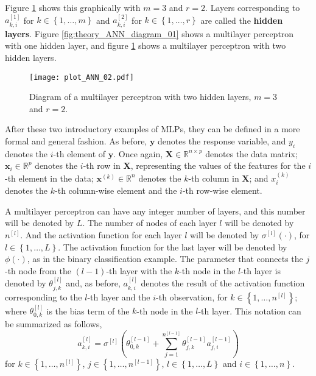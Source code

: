 Figure \ref{fig:theory_ANN_diagram_02} shows this graphically with $m = 3$ and $r = 2$. Layers corresponding to $a_{k,i}^{[1]}$ for $k \in \left\{ 1, \ldots, m \right\}$ and $a_{k,i}^{[2]}$ for $k \in \left\{ 1, \ldots, r \right\}$ are called the \textbf{hidden layers}.
Figure \ref{fig:theory_ANN_diagram_01} shows a multilayer perceptron with one hidden layer, and figure \ref{fig:theory_ANN_diagram_02} shows a multilayer perceptron with two hidden layers.

\begin{figure}[H]
    \centering
    \texttt{[image: plot\_ANN\_02.pdf]}
    \caption{Diagram of a multilayer perceptron with two hidden layers, $m = 3$ and $r = 2$.}
    \label{fig:theory_ANN_diagram_02}
\end{figure}

After these two introductory examples of MLPs, they can be defined in a more formal and general fashion.
As before, $\boldsymbol{y}$ denotes the response variable, and $y_i$ denotes the $i$-th element of $\boldsymbol{y}$.
Once again, $\boldsymbol{X} \in \mathbb{R}^{n \times p}$ denotes the data matrix; $\boldsymbol{x}_i \in \mathbb{R}^p$ denotes the $i$-th row in $\boldsymbol{X}$, representing the values of the features for the $i$-th element in the data; $\boldsymbol{x}^{(k)} \in \mathbb{R}^n$ denotes the $k$-th column in $\boldsymbol{X}$; and $x_i^{(k)}$ denotes the $k$-th column-wise element and the $i$-th row-wise element.

A multilayer perceptron can have any integer number of layers, and this number will be denoted by $L$. The number of nodes of each layer $l$ will be denoted by $n^{[l]}$. And the activation function for each layer $l$ will be denoted by $\sigma^{[l]}(\cdot)$, for $l \in \left\{ 1, \ldots, L \right\}$. The activation function for the last layer will be denoted by $\phi(\cdot)$, as in the binary classification example. The parameter that connects the $j$-th node from the $(l-1)$-th layer with the $k$-th node in the $l$-th layer is denoted by $\theta_{j,k}^{[l]}$ and, as before, $a_{k,i}^{[l]}$ denotes the result of the activation function corresponding to the $l$-th layer and the $i$-th observation, for $k \in \left\{ 1, \ldots, n^{[l]} \right\}$; where $\theta_{0,k}^{[l]}$ is the bias term of the $k$-th node in the $l$-th layer. This notation can be summarized as follows,
\begin{equation}
  \label{eq:ann_act_funct_def}
  a_{k,i}^{[l]} = \sigma^{[l]} \left( \theta_{0,k}^{[l-1]} + \sum_{j = 1}^{n^{[l-1]}} \theta_{j,k}^{[l-1]} a_{j,i}^{[l-1]} \right)
\end{equation}
for $k \in \left\{ 1, \ldots, n^{[l]} \right\}$, $j \in \left\{ 1, \ldots, n^{[l-1]} \right\}$, $l \in \left\{ 1, \ldots, L \right\}$ and $i \in \left\{ 1, \ldots, n \right\}$.

